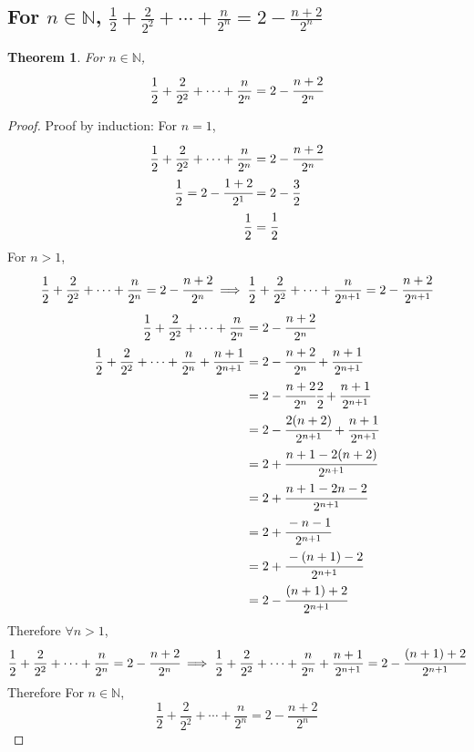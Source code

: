 \documentclass[]{article}
\newcommand{\N}{\mathbb{N}}
\newtheorem{theorem}{Theorem}
\begin{document}
\subsection{For $n \in \N$, 
    $\frac{1}{2} + \frac{2}{2^2} + \cdots + \frac{n}{2^n} = 2 - \frac{n+2}{2^n}$
}
\begin{theorem}
    For $n \in \N$, 
        $$\frac{1}{2} + \frac{2}{2^2} + \cdots + \frac{n}{2^n} = 2 - \cfrac{n+2}{2^n}$$
\end{theorem}
\begin{proof}
    Proof by induction:
    For $n = 1$,
    \begin{align*}
        \frac{1}{2} + \frac{2}{2^2} + \cdots + \frac{n}{2^n} 
            &= 2 - \cfrac{n+2}{2^n}\\
        \frac{1}{2} = 2 - \cfrac{1+2}{2^1} 
            &= 2 - \frac{3}{2}\\
        \frac{1}{2} &= \cfrac{1}{2}\\
    \end{align*}
    For $n > 1$,
    $$\frac{1}{2} + \frac{2}{2^2} + \cdots + \frac{n}{2^n} = 2 - \cfrac{n+2}{2^n}
    \implies \frac{1}{2} + \frac{2}{2^2} + \cdots + \frac{n}{2^{n+1}} = 2 - \cfrac{n+2}{2^{n+1}}$$
    \begin{align*}
        \frac{1}{2} + \frac{2}{2^2} + \cdots + \frac{n}{2^n} 
            &= 2 - \cfrac{n+2}{2^n}\\
        \frac{1}{2} + \frac{2}{2^2} + \cdots + \frac{n}{2^n} + \frac{n+1}{2^{n+1}}
            &= 2 - \cfrac{n+2}{2^n} + \cfrac{n+1}{2^{n+1}}\\
            &= 2 - \cfrac{n+2}{2^n}\cfrac{2}{2} + \cfrac{n+1}{2^{n+1}}\\
            &= 2 - \cfrac{2(n+2)}{2^{n+1}} + \cfrac{n+1}{2^{n+1}}\\
            &= 2 + \cfrac{n+1 - 2(n+2) }{2^{n+1}}\\
            &= 2 + \cfrac{n+1 - 2n - 2}{2^{n+1}}\\
            &= 2 + \cfrac{-n - 1}{2^{n+1}}\\
            &= 2 + \cfrac{-(n+1) -2}{2^{n+1}}\\
            &= 2 - \cfrac{(n+1) +2}{2^{n+1}}\\
    \end{align*}
    Therefore $\forall n > 1$,
    $$\frac{1}{2} + \frac{2}{2^2} + \cdots + \frac{n}{2^n}
        = 2 - \cfrac{n+2}{2^n}
        \implies \frac{1}{2} + \frac{2}{2^2} + \cdots + \frac{n}{2^n} + \frac{n+1}{2^{n+1}}
        = 2 - \cfrac{(n+1) +2}{2^{n+1}}$$
    Therefore For $n \in \N$,
    $$\frac{1}{2} + \frac{2}{2^2} + \cdots + \frac{n}{2^n} = 2 - \frac{n+2}{2^n}$$
\end{proof}
\end{document}
